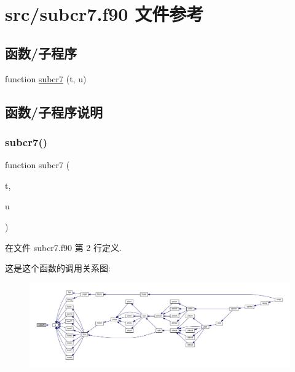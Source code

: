 \hypertarget{subcr7_8f90}{}\section{src/subcr7.f90 文件参考}
\label{subcr7_8f90}
\subsection*{函数/子程序}
\begin{DoxyCompactItemize}
\item 
function \mbox{\hyperlink{subcr7_8f90_aa0e46d4682f63e2e38407c305e255af4}{subcr7}} (t, u)
\end{DoxyCompactItemize}


\subsection{函数/子程序说明}
\mbox{\label{subcr7_8f90_aa0e46d4682f63e2e38407c305e255af4}} 
\subsubsection{\texorpdfstring{subcr7()}{subcr7()}}
{\footnotesize\ttfamily function subcr7 (\begin{DoxyParamCaption}\item[{}]{t,  }\item[{}]{u }\end{DoxyParamCaption})}



在文件 subcr7.\+f90 第 2 行定义.

这是这个函数的调用关系图\+:
\nopagebreak
\begin{figure}[H]
\begin{center}
\leavevmode
\includegraphics[width=350pt]{subcr7_8f90_aa0e46d4682f63e2e38407c305e255af4_icgraph}
\end{center}
\end{figure}
